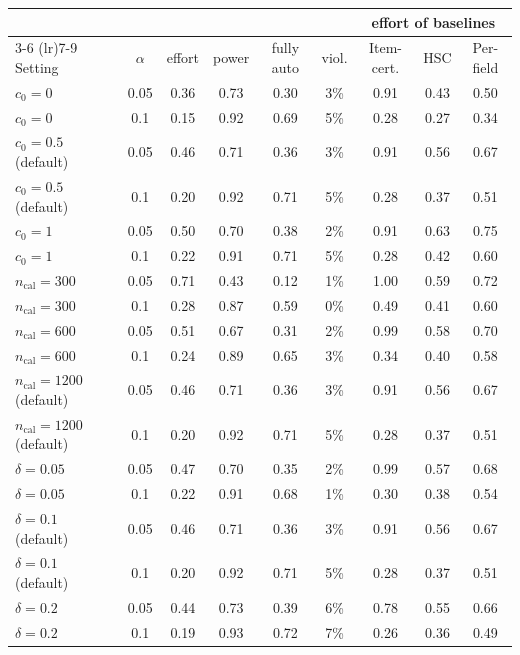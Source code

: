\begin{tabular}{lcccccccc}
\toprule
 & & \multicolumn{4}{c}{\hlcl{}} & \multicolumn{3}{c}{effort of baselines} \\
\cmidrule(lr){3-6} \cmidrule(lr){7-9}
Setting & $\alpha$ & effort & power & fully auto & viol. & Item-cert. & HSC & Per-field \\
\midrule
$c_0=0$ & 0.05 & 0.36 & 0.73 & 0.30 & 3\% & 0.91 & 0.43 & 0.50 \\
$c_0=0$ & 0.1 & 0.15 & 0.92 & 0.69 & 5\% & 0.28 & 0.27 & 0.34 \\
$c_0=0.5$ (default) & 0.05 & 0.46 & 0.71 & 0.36 & 3\% & 0.91 & 0.56 & 0.67 \\
$c_0=0.5$ (default) & 0.1 & 0.20 & 0.92 & 0.71 & 5\% & 0.28 & 0.37 & 0.51 \\
$c_0=1$ & 0.05 & 0.50 & 0.70 & 0.38 & 2\% & 0.91 & 0.63 & 0.75 \\
$c_0=1$ & 0.1 & 0.22 & 0.91 & 0.71 & 5\% & 0.28 & 0.42 & 0.60 \\
\midrule
$n_{\mathrm{cal}}=300$ & 0.05 & 0.71 & 0.43 & 0.12 & 1\% & 1.00 & 0.59 & 0.72 \\
$n_{\mathrm{cal}}=300$ & 0.1 & 0.28 & 0.87 & 0.59 & 0\% & 0.49 & 0.41 & 0.60 \\
$n_{\mathrm{cal}}=600$ & 0.05 & 0.51 & 0.67 & 0.31 & 2\% & 0.99 & 0.58 & 0.70 \\
$n_{\mathrm{cal}}=600$ & 0.1 & 0.24 & 0.89 & 0.65 & 3\% & 0.34 & 0.40 & 0.58 \\
$n_{\mathrm{cal}}=1200$ (default) & 0.05 & 0.46 & 0.71 & 0.36 & 3\% & 0.91 & 0.56 & 0.67 \\
$n_{\mathrm{cal}}=1200$ (default) & 0.1 & 0.20 & 0.92 & 0.71 & 5\% & 0.28 & 0.37 & 0.51 \\
\midrule
$\delta=0.05$ & 0.05 & 0.47 & 0.70 & 0.35 & 2\% & 0.99 & 0.57 & 0.68 \\
$\delta=0.05$ & 0.1 & 0.22 & 0.91 & 0.68 & 1\% & 0.30 & 0.38 & 0.54 \\
$\delta=0.1$ (default) & 0.05 & 0.46 & 0.71 & 0.36 & 3\% & 0.91 & 0.56 & 0.67 \\
$\delta=0.1$ (default) & 0.1 & 0.20 & 0.92 & 0.71 & 5\% & 0.28 & 0.37 & 0.51 \\
$\delta=0.2$ & 0.05 & 0.44 & 0.73 & 0.39 & 6\% & 0.78 & 0.55 & 0.66 \\
$\delta=0.2$ & 0.1 & 0.19 & 0.93 & 0.72 & 7\% & 0.26 & 0.36 & 0.49 \\
\bottomrule
\end{tabular}
